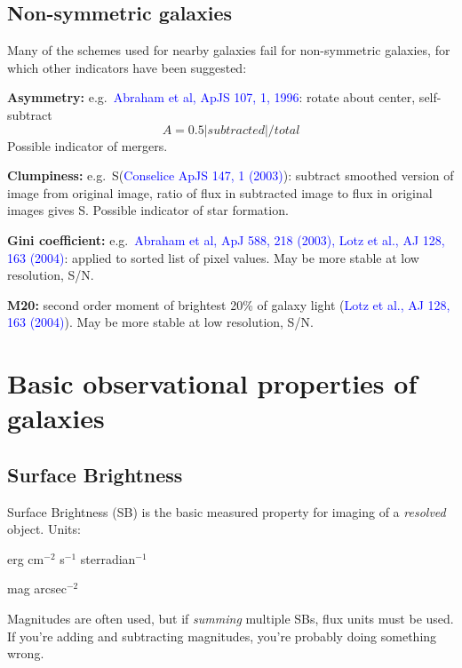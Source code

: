 \documentclass[12pt]{article}
\begin{document}
\subsection*{Non-symmetric galaxies}
Many of the schemes used for nearby galaxies fail for non-symmetric galaxies,
for which other indicators have been suggested:
\begin{itemize*}
    \item \textbf{Asymmetry:} e.g.\ \textcolor{blue}{Abraham et al, ApJS 107, 1, 1996}:
        rotate about center, self-subtract
        $$A = 0.5 \vert subtracted \vert /total$$
        Possible indicator of mergers.
    \item \textbf{Clumpiness:} e.g.\
        S(\textcolor{blue}{Conselice ApJS 147, 1 (2003)}):
        subtract smoothed version of image from original image,
        ratio of flux in subtracted image to flux in original images gives S.
        Possible indicator of star formation.
    \item \textbf{Gini coefficient:} e.g.\
        \textcolor{blue}{Abraham et al, ApJ 588, 218 (2003),
        Lotz et al., AJ 128, 163 (2004)}:
        applied to sorted list of pixel values.
        May be more stable at low resolution, S/N.
    \item \textbf{M20:} second order moment of brightest 20\% of
        galaxy light (\textcolor{blue}{Lotz et al., AJ 128, 163 (2004)}).
        May be more stable at low resolution, S/N.
\end{itemize*}

\section*{Basic observational properties of galaxies}
\subsection*{Surface Brightness}
Surface Brightness (SB) is the basic measured property for imaging of
a \emph{resolved} object. Units:
\begin{itemize*}
    \item erg cm$^{-2}$ s$^{-1}$ sterradian$^{-1}$
    \item mag arcsec$^{-2}$
\end{itemize*}
Magnitudes are often used, but if \emph{summing} multiple SBs, flux units
must be used. If you're adding and subtracting magnitudes, you're probably
doing something wrong. \Smiley
\end{document}
